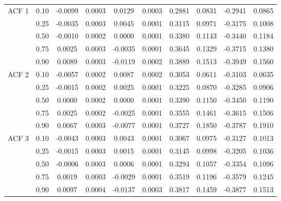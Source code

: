 \begin{table}[H]
\begin{tabular}{cccccccccc}
   \hline
ACF 1 & 0.10 & -0.0099 & 0.0003 & 0.0129 & 0.0003 & 0.2881 & 0.0831 & -0.2941 & 0.0865 \\ 
   & 0.25 & -0.0035 & 0.0003 & 0.0045 & 0.0001 & 0.3115 & 0.0971 & -0.3175 & 0.1008 \\ 
   & 0.50 & -0.0010 & 0.0002 & 0.0000 & 0.0001 & 0.3380 & 0.1143 & -0.3440 & 0.1184 \\ 
   & 0.75 & 0.0025 & 0.0003 & -0.0035 & 0.0001 & 0.3645 & 0.1329 & -0.3715 & 0.1380 \\ 
   & 0.90 & 0.0089 & 0.0003 & -0.0119 & 0.0002 & 0.3889 & 0.1513 & -0.3949 & 0.1560 \\ 
  ACF 2 & 0.10 & -0.0057 & 0.0002 & 0.0087 & 0.0002 & 0.3053 & 0.0611 & -0.3103 & 0.0635 \\ 
   & 0.25 & -0.0015 & 0.0002 & 0.0025 & 0.0001 & 0.3225 & 0.0870 & -0.3285 & 0.0906 \\ 
   & 0.50 & 0.0000 & 0.0002 & 0.0000 & 0.0001 & 0.3390 & 0.1150 & -0.3450 & 0.1190 \\ 
   & 0.75 & 0.0025 & 0.0002 & -0.0025 & 0.0001 & 0.3555 & 0.1461 & -0.3615 & 0.1506 \\ 
   & 0.90 & 0.0067 & 0.0003 & -0.0077 & 0.0001 & 0.3727 & 0.1850 & -0.3787 & 0.1910 \\ 
  ACF 3 & 0.10 & -0.0043 & 0.0003 & 0.0043 & 0.0001 & 0.3067 & 0.0975 & -0.3127 & 0.1013 \\ 
   & 0.25 & -0.0015 & 0.0003 & 0.0015 & 0.0001 & 0.3145 & 0.0998 & -0.3205 & 0.1036 \\ 
   & 0.50 & -0.0006 & 0.0003 & 0.0006 & 0.0001 & 0.3294 & 0.1057 & -0.3354 & 0.1096 \\ 
   & 0.75 & 0.0019 & 0.0003 & -0.0029 & 0.0001 & 0.3519 & 0.1196 & -0.3579 & 0.1245 \\ 
   & 0.90 & 0.0097 & 0.0004 & -0.0137 & 0.0003 & 0.3817 & 0.1459 & -0.3877 & 0.1513 \\ 
   \hline
\end{tabular}
\end{table}
